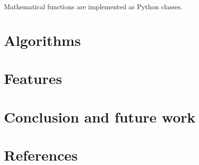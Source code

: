 \documentclass{article}
\begin{document}

Mathematical functions are implemented as Python classes.



\section{Algorithms}


\section{Features}


\section{Conclusion and future work}

\section{References}
\end{document}

